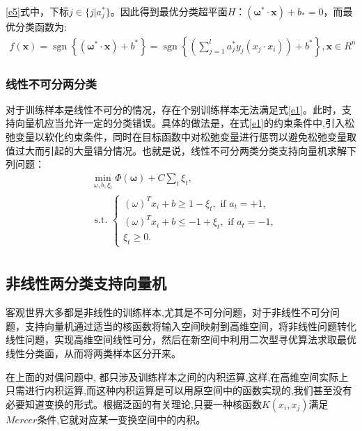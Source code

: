 \ref{e5}式中，下标$j\in \{j|a_{j}^{*}\}$。因此得到最优分类超平面$H$：$(\boldsymbol{\omega^{*}}\cdot \boldsymbol{x})+b_{*}=0$，而最优分类函数为:
\begin{equation}
    \begin{array}{c}
f(\boldsymbol{x})=\operatorname{sgn}\left\{\left(\boldsymbol{\omega}^{*} \cdot \boldsymbol{x}\right)+b^{*}\right\}=
\operatorname{sgn}\left\{\left(\sum_{j=1}^{l} a_{j}^{*} y_{j}\left(x_{j} \cdot x_{i}\right)\right)+b^{*}\right\}, \boldsymbol{x} \in R^{n}
\end{array}
\end{equation}
\subsubsection{线性不可分两分类}
对于训练样本是线性不可分的情况，存在个别训练样本无法满足式\ref{e1}。此时，支持向量机应当允许一定的分类错误。具体的做法是，在式\ref{e1}的约束条件中,引入松弛变量以软化约束条件，同时在目标函数中对松弛变量进行惩罚以避免松弛变量取值过大而引起的大量错分情况\cite{胡春2018支持向量机研究综述}。也就是说，线性不可分两类分类支持向量机求解下列问题：
\begin{equation}
\begin{aligned}
& \min _{\omega, b, \xi_t} \Phi(\boldsymbol{\omega})+C \sum_t \xi_t, \\
& \text { s.t. }\left\{\begin{array}{c}
(\omega)^T x_i+b \geq 1-\xi_t, \text { if } a_t=+1, \\
(\omega)^T x_i+b \leq-1+\xi_t, \text { if } a_t=-1, \\
\xi_t \geq 0 .
\end{array}\right. \\
&
\end{aligned}
\end{equation}

\subsection{非线性两分类支持向量机}
客观世界大多都是非线性的训练样本,尤其是不可分问题，对于非线性不可分问题，支持向量机通过适当的核函数将输入空间映射到高维空间，将非线性问题转化线性问题，实现高维空间线性可分，然后在新空间中利用二次型寻优算法求取最优线性分类面，从而将两类样本区分开来\cite{sebald2000support,萧嵘2000支持向量机理论综述}。

在上面的对偶问题中, 都只涉及训练样本之间的内积运算,这样,在高维空间实际上只需进行内积运算,而这种内积运算是可以用原空间中的函数实现的,我们甚至没有必要知道变换的形式\cite{张学工2000关于统计学习理论与支持向量机}。根据泛函的有关理论,只要一种核函数$K(x_i,x_j)$满足$Mercer$条件,它就对应某一变换空间中的内积\cite{vapnik1999nature}。

